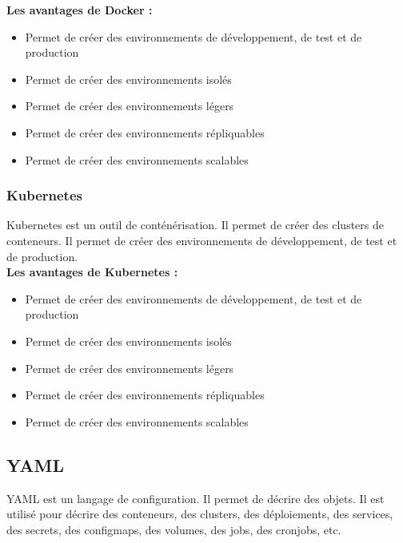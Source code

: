 \documentclass[12pt, a4paper]{article}
\begin{document}
\textbf{Les avantages de Docker :}\\
\begin{itemize}
    \item Permet de créer des environnements de développement, de test et de production
    \item Permet de créer des environnements isolés
    \item Permet de créer des environnements légers
    \item Permet de créer des environnements répliquables
    \item Permet de créer des environnements scalables
\end{itemize}

\newpage
\subsubsection{Kubernetes}
Kubernetes est un outil de conténérisation. Il permet de créer des clusters
de conteneurs. Il permet de créer des environnements de développement, de test
et de production.\\

\textbf{Les avantages de Kubernetes :}\\
\begin{itemize}
    \item Permet de créer des environnements de développement, de test et de production
    \item Permet de créer des environnements isolés
    \item Permet de créer des environnements légers
    \item Permet de créer des environnements répliquables
    \item Permet de créer des environnements scalables
\end{itemize}

\subsection{YAML}
YAML est un langage de configuration. Il permet de décrire des objets. Il est
utilisé pour décrire des conteneurs, des clusters, des déploiements, des
services, des secrets, des configmaps, des volumes, des jobs, des cronjobs,
etc.\\
\end{document}
